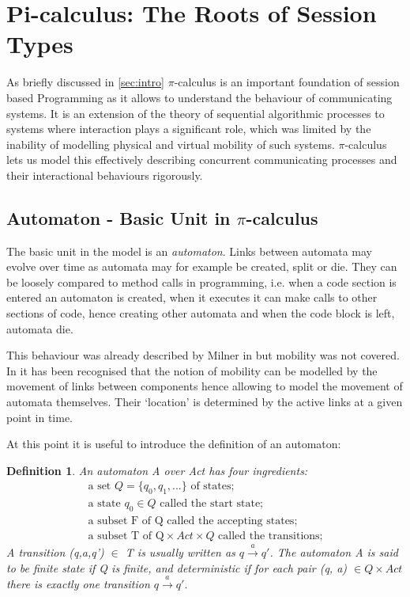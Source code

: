 
\section{Pi-calculus: The Roots of Session Types}
\label{sec:picalculus}
	
As briefly discussed in \autoref{sec:intro} $\pi$-calculus is an important foundation of session based Programming as it allows to understand the behaviour of communicating systems. It is an extension of the theory of sequential algorithmic processes to systems where interaction plays a significant role, which was limited by the inability of modelling physical and virtual mobility of such systems. $\pi$-calculus lets us model this effectively describing concurrent communicating processes and their interactional behaviours rigorously.

\subsection{Automaton - Basic Unit in $\pi$-calculus}
The basic unit in the model is an \textit{automaton}. Links between automata may evolve over time as automata may for example be created, split or die. They can be loosely compared to method calls in programming, i.e. when a code section is entered an automaton is created, when it executes it can make calls to other sections of code, hence creating other automata and when the code block is left, automata die.

This behaviour was already described by Milner in \cite{comm_sys_calc} but mobility was not covered. In \cite{pi-calculus} it has been recognised that the notion of mobility can be modelled by the movement of links between components hence allowing to model the movement of automata themselves. Their `location' is determined by the active links at a given point in time.

At this point it is useful to introduce the definition of an automaton:

\newtheorem{automaton}{Definition}
\begin{automaton}
An automaton A over Act has four ingredients:
\begin{align}
\mbox{a set }Q = \{q_0,q_1,...\}\mbox{ of states;}\nonumber\\
\mbox{a state } q_0 \in Q  \mbox{ called the start state;}\nonumber\\
\mbox{a subset F of Q called the accepting states;}\nonumber\\
\mbox{a subset T of Q} \times Act \times Q\mbox{ called the transitions;}\nonumber
\end{align}
A transition (q,a,q')  $\in$ T is usually written as $q \xrightarrow{a} q'$. The automaton A is said to be finite state if Q is finite, and deterministic if for each pair (q, a) $\in Q \times Act$ there is exactly one transition $q \xrightarrow{a} q'.$\cite{pi-calculus}
\end{automaton}

